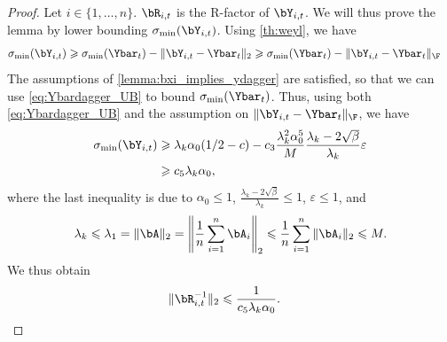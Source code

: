 \documentclass{article}
\theoremstyle{plain}
\theoremstyle{definition}
\theoremstyle{remark}
\begin{document}
\begin{proof}

  Let $i \in \{1,\dots,n\}$. $\bR_{i,t}$ is the R-factor of $\bY_{i,t}$. We will thus prove the lemma by lower bounding $\sigma_{\min}(\bY_{i,t})$. Using \cref{th:weyl}, we have
  \begin{align*}
    \sigma_{\min}(\bY_{i,t}) & \geqslant \sigma_{\min}(\Ybar_t) - \Vert \bY_{i,t} - \Ybar_t \Vert_2 \geqslant \sigma_{\min}(\Ybar_t) - \Vert \bY_{i,t} - \Ybar_t \Vert_\F
  \end{align*}
  The assumptions of \cref{lemma:bxi_implies_ydagger} are satisfied, so that we can use \eqref{eq:Ybardagger_UB} to bound $\sigma_{\min}(\Ybar_t)$. Thus, using both \eqref{eq:Ybardagger_UB} and the assumption on $\Vert \bY_{i,t} - \Ybar_t \Vert_\F$, we have
  \begin{align*}
       \sigma_{\min}(\bY_{i,t}) & \geqslant \lambda_k \alpha_0 (1/2 - c) - c_3\frac{\lambda_k^2 \alpha_0^5}{M} \frac{\lambda_k-2\sqrt{\beta}}{\lambda_k}\varepsilon \\
    & \geqslant c_5 \lambda_k\alpha_0 ,
  \end{align*}
  where the last inequality is due to $\alpha_0 \leqslant 1$,  $\frac{\lambda_k-2\sqrt{\beta}}{\lambda_k} \leqslant 1$, $\varepsilon\leqslant 1$, and 
    \begin{align}
      \lambda_k \leqslant \lambda_1 = \Vert \bA \Vert_2 = \left\Vert \frac{1}{n}\sum_{i=1}^n \bA_i \right\Vert_2 \leqslant \frac{1}{n}\sum_{i=1}^n \Vert \bA_i \Vert_2 \leqslant M. \label{eq:lambda_k_leq_M} 
  \end{align}
  We thus obtain
  \begin{align*}
    \Vert \bR_{i,t}^{-1} \Vert_2 & \leqslant \frac{1}{c_5 \lambda_k \alpha_0}.
  \end{align*}
  
\end{proof}
\end{document}
